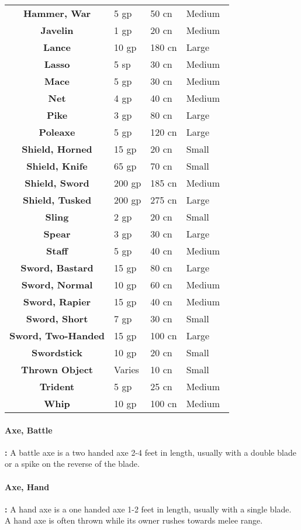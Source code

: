 \begin{multicols*}{2}
\begin {table}[H]
\begin{tabularx}{\columnwidth}{>{\bfseries}cYYY}
		Hammer, War & 5 gp & 50 cn & Medium\\
		Javelin & 1 gp & 20 cn & Medium\\
		Lance & 10 gp & 180 cn & Large\\
		Lasso & 5 sp & 30 cn & Medium\\
		Mace & 5 gp & 30 cn & Medium\\
		Net & 4 gp & 40 cn & Medium\\
		Pike & 3 gp & 80 cn & Large\\
		Poleaxe & 5 gp & 120 cn & Large\\
		Shield, Horned & 15 gp & 20 cn & Small\\
		Shield, Knife & 65 gp & 70 cn & Small\\
		Shield, Sword & 200 gp & 185 cn & Medium\\
		Shield, Tusked & 200 gp & 275 cn & Large\\
		Sling & 2 gp & 20 cn & Small\\
		Spear & 3 gp & 30 cn & Large\\
		Staff & 5 gp & 40 cn & Medium\\
		Sword, Bastard & 15 gp & 80 cn & Large\\
		Sword, Normal & 10 gp & 60 cn & Medium\\
		Sword, Rapier & 15 gp & 40 cn & Medium\\
		Sword, Short & 7 gp & 30 cn & Small\\
		Sword, Two-Handed & 15 gp & 100 cn & Large\\
		Swordstick & 10 gp & 20 cn & Small\\
		Thrown Object & Varies & 10 cn & Small\\
		Trident & 5 gp & 25 cn & Medium\\
		Whip & 10 gp & 100 cn & Medium\
  \end {tabularx}
\end {table}

\paragraph{Axe, Battle}\textbf{:} A battle axe is a two handed axe 2-4 feet in length, usually with a double blade or a spike on the reverse of the blade.

\paragraph{Axe, Hand}\textbf{:} A hand axe is a one handed axe 1-2 feet in length, usually with a single blade. A hand axe is often thrown while its owner rushes towards melee range.


\end{multicols*}
